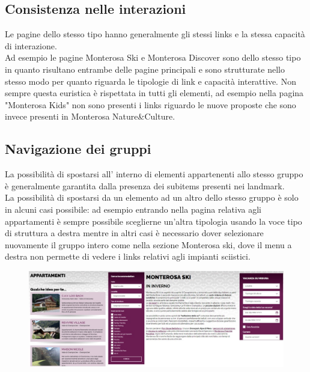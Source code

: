         \subsection{Consistenza nelle interazioni}
        Le pagine dello stesso tipo hanno generalmente gli stessi links e la
        stessa capacità di interazione. \\
        Ad esempio le pagine Monterosa Ski e Monterosa Discover sono dello
        stesso tipo in quanto risultano entrambe delle pagine principali e sono
        strutturate nello stesso modo per quanto riguarda le tipologie di link e
        capacità interattive. Non sempre questa euristica è rispettata in tutti gli
        elementi, ad esempio nella pagina "Monterosa Kids" non sono presenti i
        links riguardo le nuove proposte che sono invece presenti in Monterosa
        Nature\&Culture.
    
        \subsection{Navigazione dei gruppi}
        La possibilità di spostarsi all’ interno di elementi appartenenti allo
        stesso gruppo è generalmente garantita dalla presenza dei subitems
        presenti nei landmark. \\
        La possibilità di spostarsi da un elemento ad un altro dello stesso
        gruppo è solo in alcuni casi possibile: ad esempio entrando nella pagina
        relativa agli appartamenti è sempre possibile sceglierne un'altra
        tipologia usando la voce tipo di struttura a destra mentre in altri casi
        è necessario dover selezionare nuovamente il gruppo intero come nella sezione
        Monterosa ski, dove il menu a destra non permette di vedere i links relativi 
        agli impianti sciistici.
        \begin{figure}[H]
            \centering
            \includegraphics[scale=0.6]{resources/images/groupNavigationFinals.jpg}
        \end{figure}

